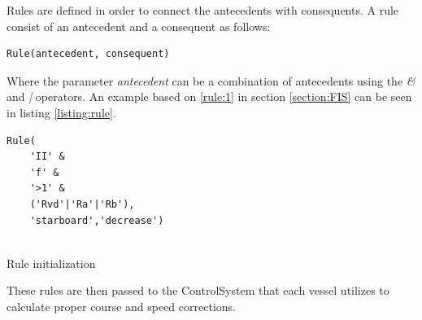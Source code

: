 Rules are defined in order to connect the antecedents with consequents.
A rule consist of an antecedent and a consequent as follows:
\begin{verbatim}
Rule(antecedent, consequent)
\end{verbatim}
Where the parameter \textit{antecedent} can be a combination of antecedents using the \textit{\&} and \textit{|} operators.
An example based on \ref{rule:1} in section \ref{section:FIS} can be seen in listing \ref{listing:rule}.
\begin{listing}[ht]{}
    \begin{verbatim}
Rule(
    'II' &
    'f' &
    '>1' &
    ('Rvd'|'Ra'|'Rb'),
    'starboard','decrease')
            
\end{verbatim}
    \caption{Rule initialization}
    \label{listing:rule}
\end{listing}

These rules are then passed to the ControlSystem that each vessel utilizes to calculate proper course and speed corrections.
